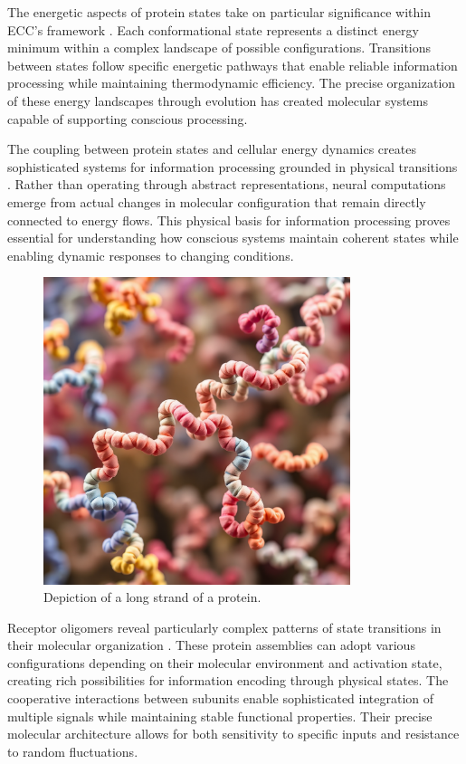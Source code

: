 The energetic aspects of protein states take on particular significance within ECC's framework \cite{Karplus2005}. Each conformational state represents a distinct energy minimum within a complex landscape of possible configurations. Transitions between states follow specific energetic pathways that enable reliable information processing while maintaining thermodynamic efficiency. The precise organization of these energy landscapes through evolution has created molecular systems capable of supporting conscious processing.

The coupling between protein states and cellular energy dynamics creates sophisticated systems for information processing grounded in physical transitions \cite{Zhou2008}. Rather than operating through abstract representations, neural computations emerge from actual changes in molecular configuration that remain directly connected to energy flows. This physical basis for information processing proves essential for understanding how conscious systems maintain coherent states while enabling dynamic responses to changing conditions.

\begin{figure}[h]
    \centering
    \includegraphics[width=0.8\textwidth]{images/protein.png}

    \caption{Depiction of a long strand of a protein.}
\end{figure}

Receptor oligomers reveal particularly complex patterns of state transitions in their molecular organization \cite{Lindorff-Larsen2016}. These protein assemblies can adopt various configurations depending on their molecular environment and activation state, creating rich possibilities for information encoding through physical states. The cooperative interactions between subunits enable sophisticated integration of multiple signals while maintaining stable functional properties. Their precise molecular architecture allows for both sensitivity to specific inputs and resistance to random fluctuations.

